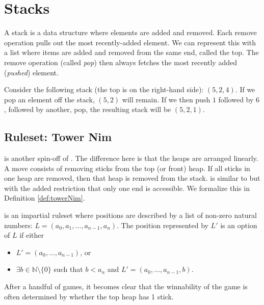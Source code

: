 \documentclass[letter,10pt]{article}
\begin{document}
\section{Stacks}
\label{section:stacks}

A stack is a data structure where elements are added and removed.  Each remove operation pulls out the most recently-added element.  We can represent this with a list where items are added and removed from the same end, called the top.  The remove operation (called \emph{pop}) then always fetches the most recently added (\emph{pushed}) element.

Consider the following stack (the top is on the right-hand side): $(5, 2, 4)$.  If we pop an element off the stack, $(5, 2)$ will remain.  If we then push $1$ followed by $6$, followed by another, pop, the resulting stack will be $(5, 2, 1)$.

\subsection{Ruleset: Tower Nim}

 is another spin-off of .  The difference here is that the heaps are arranged linearly.  A move consists of removing sticks from the top (or front) heap.  If all sticks in one heap are removed, then that heap is removed from the stack.   is similar to  \cite{DBLP:journals/combinatorics/AlbertN01}but with the added restriction that only one end is accessible. We formalize this in Definition \ref{def:towerNim}.

\begin{definition}
	\label{def:towerNim}
	 is an impartial ruleset where positions are described by a list of non-zero natural numbers: $L = (a_0, a_1, \ldots, a_{n-1}, a_n)$.  The position represented by $L'$ is an option of $L$ if either
	\begin{itemize}
		\item  $L' = (a_0, \ldots, a_{n-1})$, or
		\item  $\exists b \in \mathbb{N} \setminus \{0\}$ such that $b < a_n$ and $L' = (a_0, \ldots, a_{n-1}, b)$.
	\end{itemize}
\end{definition}

After a handful of games, it becomes clear that the winnability of the game is often determined by whether the top heap has 1 stick.
\end{document}
